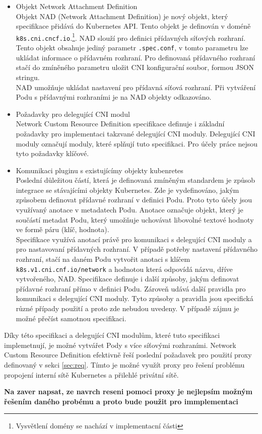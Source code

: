 \begin{itemize}
    \item Objekt Network Attachment Definition\\
    Objekt NAD (Network Attachment Definition) je nový objekt, který specifikace přidává do Kubernetes API. Tento objekt je definován v doméně \verb|k8s.cni.cncf.io|.\footnote{Vysvětlení domény se nachází v implementacní části}. NAD slouží pro definici přídavných síťových rozhraní. Tento objekt obsahuje jediný parametr \verb|.spec.conf|, v tomto parametru lze ukládat informace o přídavném rozhraní. Pro definovaná přídavného rozhraní stačí do zmíněného parametru uložit CNI konfigurační soubor, formou JSON stringu.\\
    NAD umožňuje ukládat nastavení pro přídavná síťová rozhraní. Při vytváření Podu s přídavnými rozhraními je na NAD objekty odkazováno.
    \item Požadavky pro delegující CNI modul\\
    Network Custom Resource Definition specifikace definuje i základní požadavky pro implementaci takzvané delegující CNI moduly. Delegující CNI moduly označují moduly, které splňují tuto specifikaci. Pro účely práce nejsou tyto požadavky klíčové.    
    \item Komunikaci pluginu s existujícímy objekty kubenretes\\
    Poslední důležitou částí, která je definovaná zmíněným standardem je způsob integrace se stávajícími objekty Kubernetes. Zde je vydefinováno, jakým způsobem definovat přídavné rozhraní v definici Podu. Proto tyto účely jsou využívaný anotace v metadatech Podu. Anotace označuje objekt, který je součástí metadat Podu, který umožňuje uchovávat libovolné textové hodnoty ve formě páru (klíč, hodnota).\\
    Specifikace využívá anotací právě pro komunikaci s delegující CNI moduly a pro nastavovaní přídavných rozhraní. V případě potřeby nastavení přídavného rozhraní, stačí na daném Podu vytvořit anotaci s klíčem \verb|k8s.v1.cni.cnf.io/network| a hodnotou která odpovídá názvu, dříve vytvořeného, NAD.
    Specifikace definuje i další způsoby, jakým definovat přídavné rozhraní přímo v definici Podu. Zároveň udává další pravidla pro komunikaci s delegující CNI moduly. Tyto způsoby a pravidla jsou specifická různé případy použití a proto zde nebudou uvedeny. V případě zájmu je možné přečíst samotnou specifikaci. 
\end{itemize}
Díky této specifikaci a delegující CNI modulům, které tuto specifikaci implemetnují, je možné vytvářet Pody s více síťovými rozhraními. Network Custom Resource Definition efektivně řeší poslední požadavek pro použití proxy definovaný v sekci \ref{sec:req}. Tímto je možné využít proxy pro řešení problému propojení interní sítě Kubernetes a přilehlé privátní sítě.

\textbf{Na zaver napsat, ze navrch reseni pomoci proxy je nejlepsím možným řešením daného probému a proto bude použit pro immplementaci}


